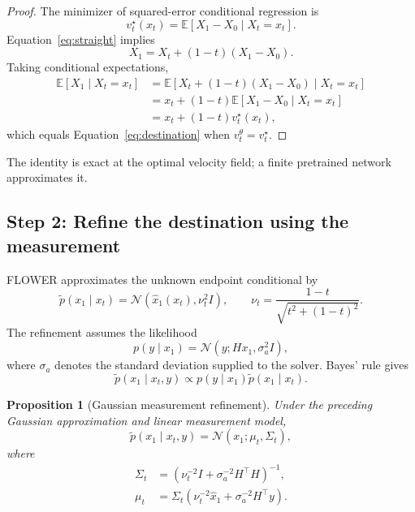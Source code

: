 \documentclass[11pt,a4paper]{article}
\newtheorem{proposition}{Proposition}
\newcommand{\E}{\mathbb{E}}
\newcommand{\Normal}{\mathcal{N}}
\newcommand{\sa}{\sigma_a}
\begin{document}
\begin{proof}
The minimizer of squared-error conditional regression is
\begin{equation}
    v_t^\star(x_t)
    =
    \E[X_1-X_0\mid X_t=x_t].
\end{equation}
Equation~\eqref{eq:straight} implies
\begin{equation}
    X_1
    =
    X_t+(1-t)(X_1-X_0).
\end{equation}
Taking conditional expectations,
\begin{align}
    \E[X_1\mid X_t=x_t]
    &=
    \E[
        X_t+(1-t)(X_1-X_0)
        \mid X_t=x_t
    ]
    \\
    &=
    x_t
    +(1-t)\E[X_1-X_0\mid X_t=x_t]
    \\
    &=
    x_t+(1-t)v_t^\star(x_t),
\end{align}
which equals Equation~\eqref{eq:destination}
when $v_t^\theta=v_t^\star$.
\end{proof}


The identity is exact at the optimal velocity field;
a finite pretrained network approximates it.


\subsection{Step 2: Refine the destination using the measurement}
FLOWER approximates the unknown endpoint conditional by
\begin{equation}
    \widetilde p(x_1\mid x_t)
    =
    \Normal\left(
        \widehat x_1(x_t),
        \nu_t^2 I
    \right),
    \qquad
    \nu_t
    =
    \frac{1-t}{\sqrt{t^2+(1-t)^2}}.
    \label{eq:gaussapprox}
\end{equation}
The refinement assumes the likelihood
\begin{equation}
    p(y\mid x_1)
    =
    \Normal(y;Hx_1,\sa^2 I),
\end{equation}
where $\sa$ denotes the standard deviation supplied to the solver.
Bayes' rule gives
\begin{equation}
    \widetilde p(x_1\mid x_t,y)
    \propto
    p(y\mid x_1)
    \widetilde p(x_1\mid x_t).
    \label{eq:bayesstep2}
\end{equation}
\begin{proposition}[Gaussian measurement refinement]
Under the preceding Gaussian approximation and linear measurement model,
\begin{equation}
    \widetilde p(x_1\mid x_t,y)
    =
    \Normal(x_1;\mu_t,\Sigma_t),
\end{equation}
where
\begin{align}
    \Sigma_t
    &=
    \left(
        \nu_t^{-2}I
        +
        \sa^{-2}H^\top H
    \right)^{-1},
    \label{eq:cov}
    \\
    \mu_t
    &=
    \Sigma_t
    \left(
        \nu_t^{-2}\widehat x_1
        +
        \sa^{-2}H^\top y
    \right).
    \label{eq:mean}
\end{align}

\end{proposition}
\end{document}
